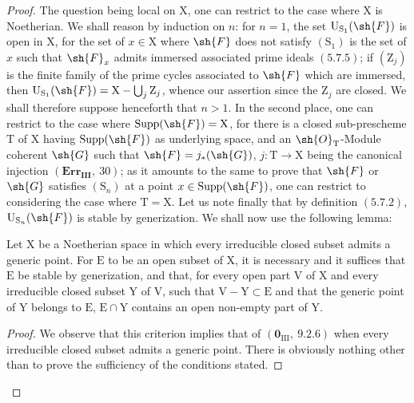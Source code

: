 \begin{proof}
The question being local on $\mathrm{X}$, one can restrict to the case where $\mathrm{X}$ is Noetherian.
We shall reason by induction on $n$: for $n=1$, the set $\mathrm{U}_{\mathrm{S}_1}(\sh{F})$ is open
in $\mathrm{X}$, for the set of $x\in\mathrm{X}$ where $\sh{F}$ does not satisfy $(\mathrm{S}_1)$ is the set of $x$ such that $\sh{F}_x$
admits immersed associated prime ideals $(5.7.5)$; if $(\mathrm{Z}_j)$ is the finite family of the
prime cycles associated to $\sh{F}$ which are immersed, then $\mathrm{U}_{\mathrm{S}_1}(\sh{F})=\mathrm{X}-\bigcup_j\mathrm{Z}_j$,
whence our assertion since the $\mathrm{Z}_j$ are closed. We shall therefore suppose henceforth that
$n>1$. In the second place, one can restrict to the case where $\operatorname{Supp}(\sh{F})=\mathrm{X}$, for there is a
closed sub-prescheme $\mathrm{T}$ of $\mathrm{X}$ having $\operatorname{Supp}(\sh{F})$ as underlying space, and an $\sh{O}_\mathrm{T}$-Module
coherent $\sh{G}$ such that $\sh{F}=j_*(\sh{G})$, $j:\mathrm{T}\to\mathrm{X}$ being the canonical injection $(\textbf{Err}_\textbf{III},~30)$;
as it amounts to the same to prove that $\sh{F}$ or $\sh{G}$ satisfies $(\mathrm{S}_n)$ at a point $x\in\operatorname{Supp}(\sh{F})$,
one can restrict to considering the case where $\mathrm{T}=\mathrm{X}$. Let us note finally that by definition $(5.7.2)$,
$\mathrm{U}_{\mathrm{S}_n}(\sh{F})$ is stable by generization. We shall now use the following lemma:

\begin{lemma}[6.11.6.1]
\label{IV.6.11.6.1}
Let $\mathrm{X}$ be a Noetherian space in which every irreducible closed subset
admits a generic point. For $\mathrm{E}$ to be an open subset of $\mathrm{X}$, it is necessary and it
suffices that $\mathrm{E}$ be stable by generization, and that, for every open part $\mathrm{V}$ of $\mathrm{X}$ and every irreducible
closed subset $\mathrm{Y}$ of $\mathrm{V}$, such that $\mathrm{V}-\mathrm{Y}\subset\mathrm{E}$ and that the generic point of $\mathrm{Y}$ belongs to $\mathrm{E}$,
$\mathrm{E}\cap\mathrm{Y}$ contains an open non-empty part of $\mathrm{Y}$.
\end{lemma}

\begin{proof}
We observe that this criterion implies that of $(\mathbf{0}_{\mathrm{III}},~9.2.6)$ when every irreducible
closed subset admits a generic point. There is obviously nothing other than to prove
the sufficiency of the conditions stated.


\end{proof}
\end{proof}
